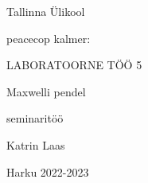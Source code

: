 \begin{titlepage}
\par{Tallinna Ülikool}
\vspace{0.3\textheight}
\par{peacecop kalmer:}
\LARGE
\par{LABORATOORNE TÖÖ 5}
\par{Maxwelli pendel}
\normalsize
\par{seminaritöö}
\vspace{0.3\textheight}
\begin{flushright}
\par{Katrin Laas}
\end{flushright}
\vfill
Harku
\hfill
2022-2023
\end{titlepage}
